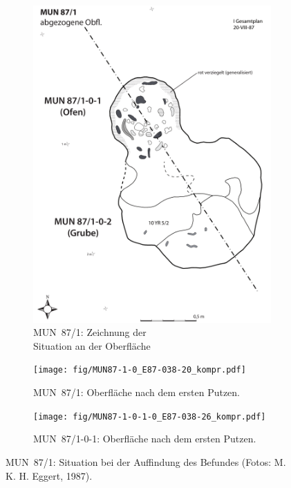 \begin{figure}[p]
	\centering
	\begin{subfigure}[t]{0.32\textwidth}
		\centering
		\includegraphics[width = \textwidth]{fig/MUN87-1_1a.pdf}
		\caption{MUN~87/1: Zeichnung der \\Situation an der Oberfläche}
		\label{fig:MUN87-1-0_Zeichnung}
	\end{subfigure}\hfill
	\begin{subfigure}[t]{0.32\textwidth}
		\centering
		\texttt{[image: fig/MUN87-1-0\_E87-038-20\_kompr.pdf]}
		\caption{MUN~87/1: Oberfläche nach dem ersten Putzen.}
		\label{fig:MUN87-1-0_Foto}
	\end{subfigure}\hfill
	\begin{subfigure}[t]{0.32\textwidth}
		\centering
		\texttt{[image: fig/MUN87-1-0-1-0\_E87-038-26\_kompr.pdf]}
		\caption{MUN~87/1-0-1: Oberfläche nach dem ersten Putzen.}
		\label{fig:MUN87-1-0-1-0_Foto}
	\end{subfigure}
	\caption{MUN~87/1: Situation bei der Auffindung des Befundes (Fotos: M. K. H. Eggert, 1987).}
	\label{fig:MUN87-1_Obfl_ZeichnungFoto}
\end{figure}

